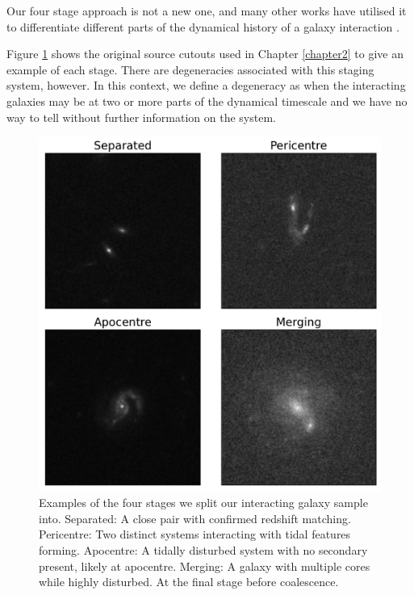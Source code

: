 \noindent Our four stage approach is not a new one, and many other works have utilised it to differentiate different parts of the dynamical history of a galaxy interaction \citep[e.g][]{2022ApJ...937...97C, 2023ApJ...952..122G}.

Figure \ref{fig:stages} shows the original source cutouts used in Chapter \ref{chapter2} to give an example of each stage. There are degeneracies associated with this staging system, however. In this context, we define a degeneracy as when the interacting galaxies may be at two or more parts of the dynamical timescale and we have no way to tell without further information on the system.

\begin{figure}
\centering
\includegraphics[width=\textwidth]{Chapter3/figures/examples-stages.pdf}
\caption[Examples of the four stages we split our interacting galaxy sample into.]{Examples of the four stages we split our interacting galaxy sample into. Separated: A close pair with confirmed redshift matching. Pericentre: Two distinct systems interacting with tidal features forming. Apocentre: A tidally disturbed system with no secondary present, likely at apocentre. Merging: A galaxy with multiple cores while highly disturbed. At the final stage before coalescence.}
\label{fig:stages}
\end{figure}

